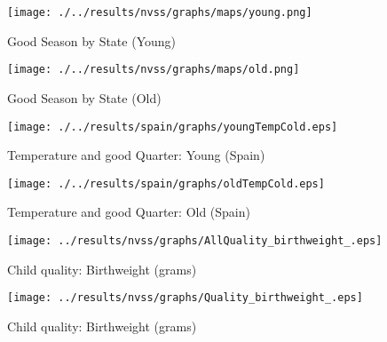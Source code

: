 \begin{figure}[htpb!]
\begin{center}
  \centering
  \caption{Good Season by State (Young)}
  \texttt{[image: ./../results/nvss/graphs/maps/young.png]}
  \label{fig:mapYoung}
\end{center}
\end{figure}

\begin{figure}[htpb!]
\begin{center}
  \centering
  \caption{Good Season by State (Old)}
  \texttt{[image: ./../results/nvss/graphs/maps/old.png]}
  \label{fig:mapOld}
\end{center}
\end{figure}

\begin{figure}[htpb!]
\begin{center}
  \centering
  \caption{Temperature and good Quarter: Young (Spain)}
  \texttt{[image: ./../results/spain/graphs/youngTempCold.eps]}
  \label{fig:mapYoung}
\end{center}
\end{figure}
\clearpage

\begin{figure}[htpb!]
\begin{center}
  \centering
  \caption{Temperature and good Quarter: Old (Spain)}
  \texttt{[image: ./../results/spain/graphs/oldTempCold.eps]}
  \label{fig:mapOld}
\end{center}
\end{figure}

\begin{figure}[htpb!]
\centering
\caption{Child quality: Birthweight (grams)}
\label{QBwt}
\texttt{[image: ../results/nvss/graphs/AllQuality\_birthweight\_.eps]}
\end{figure}
\vspace{1cm}

\begin{figure}[htpb!]
\centering
\caption{Child quality: Birthweight (grams)}
\label{QApgar}
\texttt{[image: ../results/nvss/graphs/Quality\_birthweight\_.eps]}
\end{figure}
\vspace{1cm}



